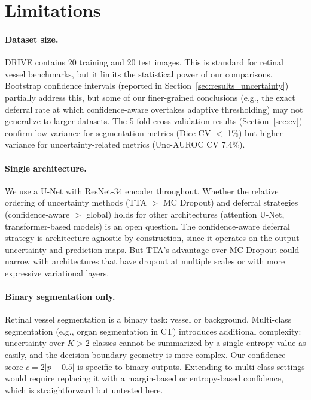 \section{Limitations}
\label{sec:limitations}

\paragraph{Dataset size.} DRIVE contains 20 training and 20 test images.
This is standard for retinal vessel benchmarks, but it limits the statistical
power of our comparisons. Bootstrap confidence intervals (reported in
Section~\ref{sec:results_uncertainty}) partially address this, but some of
our finer-grained conclusions (e.g., the exact deferral rate at which
confidence-aware overtakes adaptive thresholding) may not generalize to
larger datasets. The 5-fold cross-validation results
(Section~\ref{sec:cv}) confirm low variance for segmentation metrics
(Dice CV $<$ 1\%) but higher variance for uncertainty-related metrics
(Unc-AUROC CV 7.4\%).

\paragraph{Single architecture.} We use a U-Net with ResNet-34 encoder
throughout. Whether the relative ordering of uncertainty methods (TTA $>$
MC Dropout) and deferral strategies (confidence-aware $>$ global) holds
for other architectures (attention U-Net, transformer-based models) is an
open question. The confidence-aware deferral strategy is architecture-agnostic
by construction, since it operates on the output uncertainty and prediction
maps. But TTA's advantage over MC Dropout could narrow with architectures
that have dropout at multiple scales or with more expressive variational
layers.

\paragraph{Binary segmentation only.} Retinal vessel segmentation is a
binary task: vessel or background. Multi-class segmentation (e.g., organ
segmentation in CT) introduces additional complexity: uncertainty over
$K > 2$ classes cannot be summarized by a single entropy value as easily,
and the decision boundary geometry is more complex. Our confidence score
$c = 2|p - 0.5|$ is specific to binary outputs. Extending to multi-class
settings would require replacing it with a margin-based or entropy-based
confidence, which is straightforward but untested here.

